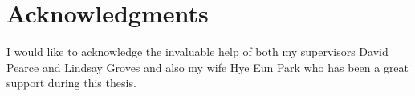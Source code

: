 
\chapter*{Acknowledgments}\label{C:ack} 

I would like to acknowledge the invaluable help of both my supervisors David Pearce and Lindsay Groves and also my wife Hye Eun Park who has been a great support during this thesis.
